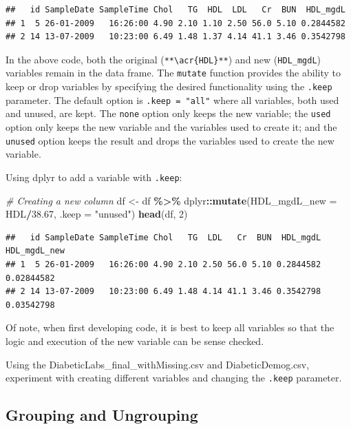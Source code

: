 \documentclass[
]{book}
\newenvironment{Shaded}{\begin{snugshade}}{\end{snugshade}}
\newcommand{\AttributeTok}[1]{\textcolor[rgb]{0.13,0.29,0.53}{#1}}
\newcommand{\CommentTok}[1]{\textcolor[rgb]{0.56,0.35,0.01}{\textit{#1}}}
\newcommand{\DecValTok}[1]{\textcolor[rgb]{0.00,0.00,0.81}{#1}}
\newcommand{\FloatTok}[1]{\textcolor[rgb]{0.00,0.00,0.81}{#1}}
\newcommand{\FunctionTok}[1]{\textcolor[rgb]{0.13,0.29,0.53}{\textbf{#1}}}
\newcommand{\NormalTok}[1]{#1}
\newcommand{\OtherTok}[1]{\textcolor[rgb]{0.56,0.35,0.01}{#1}}
\newcommand{\SpecialCharTok}[1]{\textcolor[rgb]{0.81,0.36,0.00}{\textbf{#1}}}
\newcommand{\StringTok}[1]{\textcolor[rgb]{0.31,0.60,0.02}{#1}}
\newcounter{none} %
\begin{document}
\begin{verbatim}
##   id SampleDate SampleTime Chol   TG  HDL  LDL   Cr  BUN  HDL_mgdL
## 1  5 26-01-2009   16:26:00 4.90 2.10 1.10 2.50 56.0 5.10 0.2844582
## 2 14 13-07-2009   10:23:00 6.49 1.48 1.37 4.14 41.1 3.46 0.3542798
\end{verbatim}

In the above code, both the original (\texttt{**\textbackslash{}acr\{HDL\}**}) and new (\texttt{HDL\_mgdL}) variables remain in the data frame. The \texttt{mutate} function provides the ability to keep or drop variables by specifying the desired functionality using the \texttt{.keep} parameter. The default option is \texttt{.keep\ =\ "all"} where all variables, both used and unused, are kept. The \texttt{none} option only keeps the new variable; the \texttt{used} option only keeps the new variable and the variables used to create it; and the \texttt{unused} option keeps the result and drops the variables used to create the new variable.

Using dplyr to add a variable with \texttt{.keep}:

\begin{Shaded}
\begin{Highlighting}[]
\CommentTok{\# Creating a new column }
\NormalTok{df }\OtherTok{\textless{}{-}}\NormalTok{ df }\SpecialCharTok{\%\textgreater{}\%}\NormalTok{ dplyr}\SpecialCharTok{::}\FunctionTok{mutate}\NormalTok{(}\AttributeTok{HDL\_mgdL\_new =}\NormalTok{ HDL}\SpecialCharTok{/}\FloatTok{38.67}\NormalTok{, }\AttributeTok{.keep =} \StringTok{"unused"}\NormalTok{)}
\FunctionTok{head}\NormalTok{(df, }\DecValTok{2}\NormalTok{)}
\end{Highlighting}
\end{Shaded}

\begin{verbatim}
##   id SampleDate SampleTime Chol   TG  LDL   Cr  BUN  HDL_mgdL HDL_mgdL_new
## 1  5 26-01-2009   16:26:00 4.90 2.10 2.50 56.0 5.10 0.2844582   0.02844582
## 2 14 13-07-2009   10:23:00 6.49 1.48 4.14 41.1 3.46 0.3542798   0.03542798
\end{verbatim}

Of note, when first developing code, it is best to keep all variables so that the logic and execution of the new variable can be sense checked.

Using the DiabeticLabs\_final\_withMissing.csv and DiabeticDemog.csv, experiment with creating different variables and changing the \texttt{.keep} parameter.

\subsection{Grouping and Ungrouping}\label{sec:groupingUnGrouping}
\end{document}
